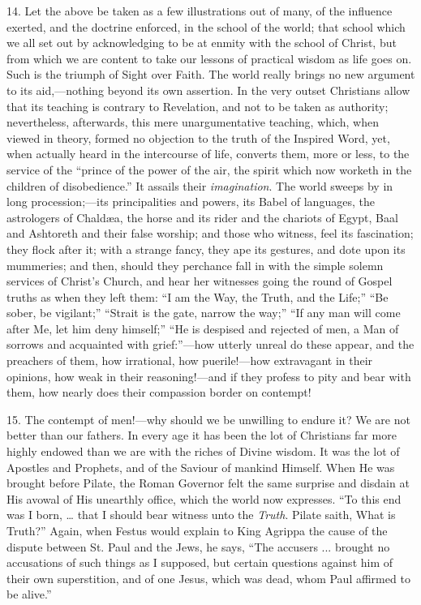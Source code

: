 14. Let the above be taken as a few illustrations out of many, of
the influence exerted, and the doctrine enforced, in the school of the
world; that school which we all set out by acknowledging to be at
enmity with the school of Christ, but from which we are content to
take our lessons of practical wisdom as life goes on. Such is the
triumph of Sight over Faith. The world really brings no new argument
to its aid,—nothing beyond its own assertion. In the very outset
Christians allow that its teaching is contrary to Revelation, and not
to be taken as authority; nevertheless, afterwards, this mere
unargumentative teaching, which, when viewed in theory, formed no
objection to the truth of the Inspired Word, yet, when actually heard
in the intercourse of life, converts them, more or less, to the
service of the ``prince of the power of the air, the spirit which
now worketh in the children of disobedience.'' It assails their \emph{imagination}. The world sweeps by in long procession;—its
principalities and powers, its Babel of languages, the astrologers of
Chaldæa, the horse and its rider and the chariots of Egypt, Baal and
Ashtoreth and their false worship; and those who witness, feel its
fascination; they flock after it; with a strange fancy, they ape its
gestures, and dote upon its mummeries; and then, should they perchance
fall in with the simple solemn services of Christ's Church, and hear
her witnesses going the round of Gospel truths as when they left them:
``I am the Way, the Truth, and the Life;'' ``Be sober, be
vigilant;'' ``Strait is the gate, narrow the way;''
``If any man will come after Me, let him deny himself;''
``He is despised and rejected of men, a Man of sorrows and
acquainted with grief:''—how utterly unreal do these appear, and
the preachers of them, how irrational, how puerile!—how extravagant
in their opinions, how weak in their reasoning!—and if they profess
to pity and bear with them, how nearly does their compassion border on
contempt!

15. The contempt of men!—why should we be unwilling to endure it?
We are not better than our fathers. In every age it has been the lot
of Christians far more highly endowed than we are with the riches of
Divine wisdom. It was the lot of Apostles and Prophets, and of the
Saviour of mankind Himself. When He was brought before Pilate, the
Roman Governor felt the same surprise and disdain at His avowal of His
unearthly office, which the world now expresses. ``To this end was
I born, … that I should bear witness unto the \emph{Truth}. Pilate
saith, What is Truth?'' Again, when Festus would explain to King
Agrippa the cause of the dispute between St. Paul and the Jews, he
says, ``The accusers ... brought no accusations of such things as
I supposed, but certain questions against him of their own
superstition, and of one Jesus, which was dead, whom Paul affirmed to
be alive.''

